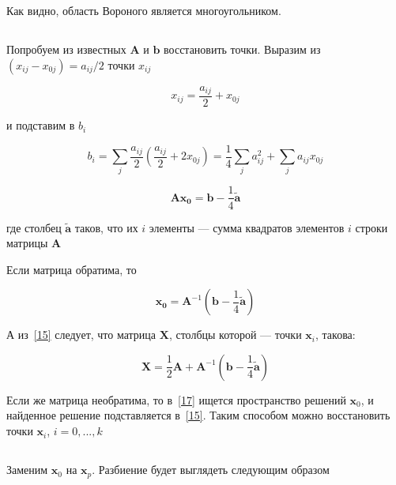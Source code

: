 	Как видно, область Вороного является многоугольником.
	
	\subsection{}
	
	Попробуем из известных $\mathbf{A}$ и $\mathbf{b}$ восстановить точки.
	Выразим из $ (x_{ij}-x_{0j}) = a_{ij}/2$ точки $x_{ij}$
	
	\begin{equation}
	\label{15}
	x_{ij} = \frac{a_{ij}}{2} + x_{0j} 
	\end{equation}
	
	и подставим в $b_i$
	
	\begin{equation}
	b_i = \sum_j \frac{a_{ij}}{2}(\frac{a_{ij}}{2} + 2x_{0j}) = \frac14 \sum_j a_{ij}^2 + \sum_j a_{ij} x_{0j}
	\end{equation}
	
	\begin{equation}
	\label{17}
	\mathbf{A} \mathbf{x_0} = \mathbf{b} -  \frac 14  \mathbf{\tilde{a}}
	\end{equation}
	
	где столбец $\mathbf{\tilde{a}}$ таков, что их $i$ элементы --- сумма квадратов элементов $i$ строки матрицы $\mathbf{A}$ 
	
	Если матрица обратима, то
	
	\begin{equation}
	\mathbf{x_0} = \mathbf{A}^{-1} (\mathbf{b} - \frac 14  \mathbf{\tilde{a}})
	\end{equation}
	
	А из~\eqref{15} следует, что матрица $\mathbf{X}$, столбцы которой --- точки $\mathbf{x}_i$, такова:
	
	\begin{equation}
	\mathbf{X} = \frac 12 \mathbf{A} + \mathbf{A}^{-1} (\mathbf{b} - \frac 14  \mathbf{\tilde{a}})
	\end{equation}
	
	Если же матрица необратима, то в~\eqref{17} ищется пространство решений $\mathbf{x}_0$, и найденное решение подставляется в~\eqref{15}. Таким способом можно восстановить точки $\mathbf{x}_i$, $i=0,...,k$
	
	\subsection{}
	
	Заменим $\mathbf{x}_0$ на $\mathbf{x}_p$. Разбиение будет выглядеть следующим образом
	
